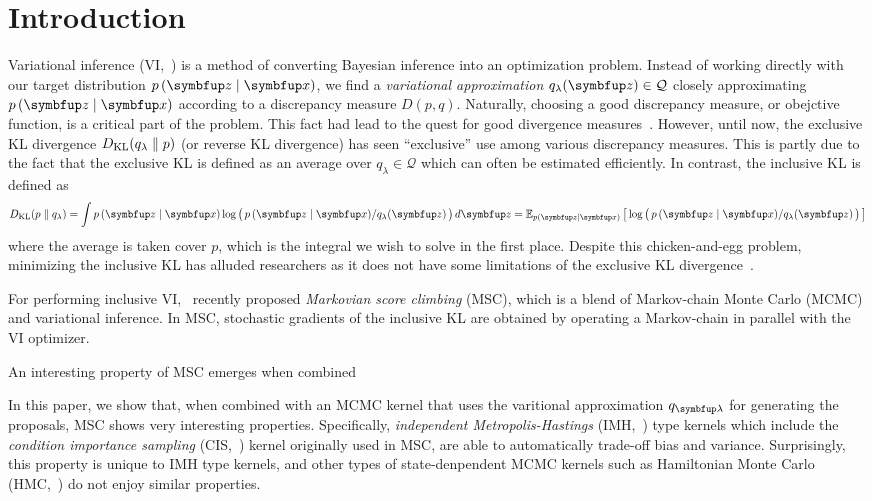 
\section{Introduction}
Variational inference (VI,~\citealt{jordan_introduction_1999, blei_variational_2017}) is a method of converting Bayesian inference into an optimization problem.
Instead of working directly with our target distribution \(p\,(\vz\mid\vx)\), we find a \textit{variational approximation} \(q_{\lambda}(\vz) \in \mathcal{Q}\) closely approximating \(p\,(\vz\mid\vx)\) according to a discrepancy measure \(D(p, q)\).
Naturally, choosing a good discrepancy measure, or obejctive function, is a critical part of the problem.
This fact had lead to the quest for good divergence measures~\citep{NIPS2016_7750ca35, NIPS2017_35464c84, pmlr-v97-ruiz19a}.
However, until now, the exclusive KL divergence \(D_{\mathrm{KL}}(q_{\lambda}\parallel p)\) (or reverse KL divergence) has seen ``exclusive'' use among various discrepancy measures.
This is partly due to the fact that the exclusive KL is defined as an average over \(q_{\lambda} \in \mathcal{Q}\) which can often be estimated efficiently.
In contrast, the inclusive KL is defined as
%
\begin{align}
  \DKL{p}{q_{\lambda}} = \int p\,(\vz\mid\vx) \log\big(\, p\,(\vz\mid\vx)/q_{\lambda}(\vz) \,\big)\,d\vz
  = \Esub{p(\vz\mid\vx)}{\log\big(\, p\,(\vz\mid\vx)/q_{\lambda}(\vz) \,\big) } \label{eq:klpq}
\end{align}
%
where the average is taken cover \(p\), which is the integral we wish to solve in the first place.
Despite this chicken-and-egg problem, minimizing the inclusive KL has alluded researchers as it does not have some limitations of the exclusive KL divergence~\citep{minka2005divergence, mackay_local_2001}.

For performing inclusive VI,~\citet{NEURIPS2020_b2070693} recently proposed \textit{Markovian score climbing} (MSC), which is a blend of Markov-chain Monte Carlo (MCMC) and variational inference.
In MSC, stochastic gradients of the inclusive KL are obtained by operating a Markov-chain in parallel with the VI optimizer.

 An interesting property of MSC emerges when combined

In this paper, we show that, when combined with an MCMC kernel that uses the varitional approximation \(q_{\vlambda}\) for generating the proposals, MSC shows very interesting properties.
Specifically, \textit{independent Metropolis-Hastings} (IMH,~\citealt{robert_monte_2004}) type kernels which include the \textit{condition importance sampling} (CIS,~\citealt{NEURIPS2020_b2070693}) kernel originally used in MSC, are able to automatically trade-off bias and variance.
Surprisingly, this property is unique to IMH type kernels, and other types of state-denpendent MCMC kernels such as Hamiltonian Monte Carlo (HMC,~\citealt{duane_hybrid_1987, neal_mcmc_2011, betancourt_conceptual_2017}) do not enjoy similar properties.

